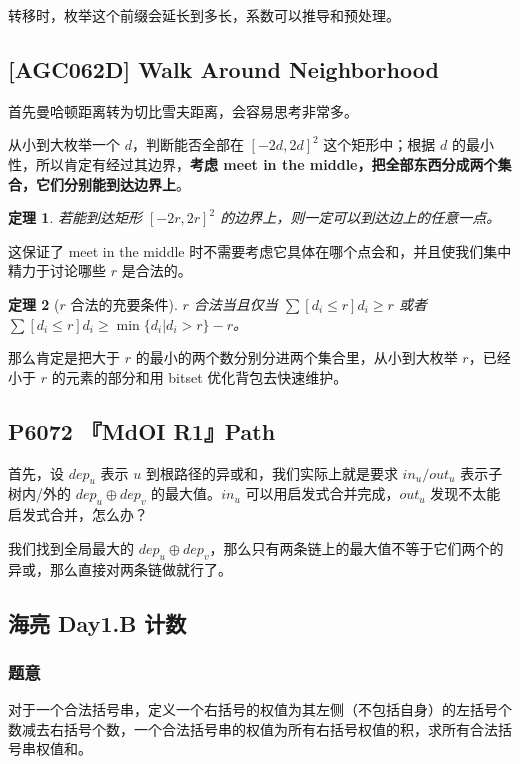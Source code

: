 \documentclass[12pt, a4paper, oneside]{ctexart}
\newtheorem{theorem}{定理}[subsection]
\begin{document}
转移时，枚举这个前缀会延长到多长，系数可以推导和预处理。

\subsection{[AGC062D] Walk Around Neighborhood}

首先曼哈顿距离转为切比雪夫距离，会容易思考非常多。

从小到大枚举一个 $d$，判断能否全部在 $\left[-2d,2d\right]^2$ 这个矩形中；根据 $d$ 的最小性，所以肯定有经过其边界，\textbf{考虑 meet in the middle，把全部东西分成两个集合，它们分别能到达边界上}。

\begin{theorem}
    若能到达矩形 $[-2r,2r]^2$ 的边界上，则一定可以到达边上的任意一点。
\end{theorem}

这保证了 meet in the middle 时不需要考虑它具体在哪个点会和，并且使我们集中精力于讨论哪些 $r$ 是合法的。

\begin{theorem}[$r$ 合法的充要条件]
    $r$ 合法当且仅当 $\sum [d_i\le r] d_i\ge r$ 或者 $\sum [d_i\le r] d_i\ge \min\{d_i|d_i>r\}-r$。 
\end{theorem}

那么肯定是把大于 $r$ 的最小的两个数分别分进两个集合里，从小到大枚举 $r$，已经小于 $r$ 的元素的部分和用 bitset 优化背包去快速维护。

\subsection{P6072 『MdOI R1』Path}

首先，设 $dep_u$ 表示 $u$ 到根路径的异或和，我们实际上就是要求 $in_u/out_u$ 表示子树内/外的 $dep_u\oplus dep_v$ 的最大值。$in_u$ 可以用启发式合并完成，$out_u$ 发现不太能启发式合并，怎么办？

我们找到全局最大的 $dep_u\oplus dep_v$，那么只有两条链上的最大值不等于它们两个的异或，那么直接对两条链做就行了。

\subsection{海亮 Day1.B 计数}

\subsubsection{题意}

对于一个合法括号串，定义一个右括号的权值为其左侧（不包括自身）的左括号个数减去右括号个数，一个合法括号串的权值为所有右括号权值的积，求所有合法括号串权值和。
\end{document}
